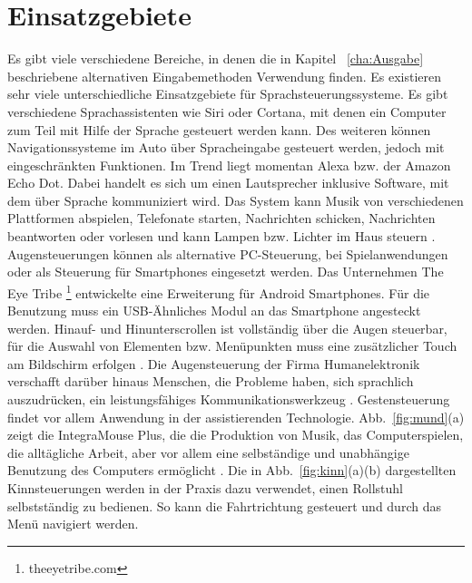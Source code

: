 \section{Einsatzgebiete}
%
%
Es gibt viele verschiedene Bereiche, in denen die in Kapitel ~\ref{cha:Ausgabe} beschriebene alternativen Eingabemethoden Verwendung finden.
\newline \newline
Es existieren sehr viele unterschiedliche Einsatzgebiete für Sprachsteuerungssysteme. Es gibt verschiedene Sprachassistenten wie \zB Siri oder Cortana, mit denen ein Computer zum Teil mit Hilfe der Sprache gesteuert werden kann.
Des weiteren können Navigationssysteme im Auto über Spracheingabe gesteuert werden, jedoch mit eingeschränkten Funktionen. Im Trend liegt momentan Alexa bzw. der Amazon Echo Dot. Dabei handelt es sich um einen Lautsprecher inklusive Software, mit dem über Sprache kommuniziert wird. Das System kann Musik von verschiedenen Plattformen abspielen, Telefonate starten, Nachrichten schicken, Nachrichten beantworten oder vorlesen und kann Lampen bzw. Lichter im Haus steuern \cite{Alexa}. 
\newline \newline \newline \newline
Augensteuerungen können als alternative PC-Steuerung, bei Spielanwendungen oder als Steuerung für Smartphones eingesetzt werden. Das Unternehmen The Eye Tribe%
\footnote{theeyetribe.com}
%
entwickelte eine Erweiterung für Android Smartphones. Für die Benutzung muss ein USB-Ähnliches Modul an das Smartphone angesteckt werden. Hinauf- und Hinunterscrollen ist vollständig über die Augen steuerbar, für die Auswahl von Elementen bzw. Menüpunkten muss eine zusätzlicher Touch am Bildschirm erfolgen \cite{eyeTribe}. Die Augensteuerung der Firma Humanelektronik verschafft darüber hinaus Menschen, die Probleme haben, sich sprachlich auszudrücken, ein leistungsfähiges Kommunikationswerkzeug \cite{SEETECH}.
\newline \newline
Gestensteuerung findet vor allem Anwendung in der assistierenden Technologie. Abb.~\ref{fig:mund}(a) zeigt die IntegraMouse Plus, die die Produktion von Musik, das Computerspielen, die alltägliche Arbeit, aber vor allem eine selbständige und unabhängige Benutzung des Computers ermöglicht \cite{INTEGRA_Stories}. Die in Abb.~\ref{fig:kinn}(a)(b) dargestellten Kinnsteuerungen werden in der Praxis dazu verwendet, einen Rollstuhl selbstständig zu bedienen. So kann die Fahrtrichtung gesteuert und durch das Menü navigiert werden.
